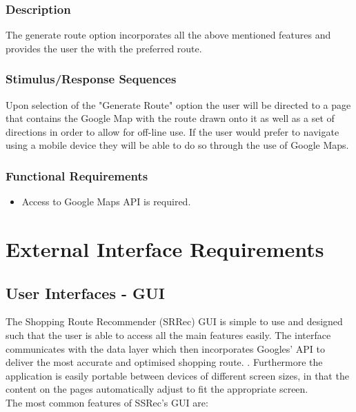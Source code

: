 \documentclass[10pt, a4paper, twocolumn]{scrartcl}
\begin{document}
			\subsubsection{Description}
			
				The generate route option incorporates all the above mentioned features and provides the user the with the preferred route. 
	
			\subsubsection{Stimulus/Response Sequences}
			
				Upon selection of the "Generate Route" option the user will be directed to a page that contains the Google Map with the route drawn onto it as well as a set of directions in order to allow for off-line use. If the user would prefer to navigate using a mobile device they will be able to do so through the use of Google Maps.
	
			\subsubsection{Functional Requirements}
	
				\begin{itemize}
					\item Access to Google Maps API is required.
				\end{itemize}
	
	
	\section{External Interface Requirements}
	
		\subsection{User Interfaces - GUI}
	
			The Shopping Route Recommender (SRRec) GUI is simple to use and designed such that the user is able to access all the main features easily. The interface communicates with the data layer which then incorporates Googles' API to deliver the most accurate and optimised shopping route. . Furthermore the application is easily portable between devices of different screen sizes, in that the content on the pages automatically adjust to fit the appropriate screen.\\
	
			The most common features of SSRec's GUI are:
	
\end{document}

